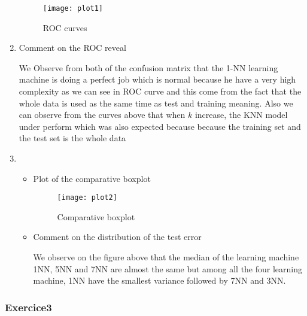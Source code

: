 \documentclass[12pt,a4paper]{article}
\begin{document}
\begin{enumerate}
\begin{figure}[H]
	\centering
	\texttt{[image: plot1]}
		\caption{ROC curves}
\end{figure}
	
\item Comment on the ROC reveal

We Observe from both of the confusion matrix that the 1-NN learning machine is doing a perfect job which is normal because he have a very high complexity as we can see in ROC curve and this come from the fact that the whole data is used as the same time as test and training meaning. Also we can observe from the curves above that when $k$ increase, the KNN model under perform which was also expected because because the training set and the test set is the whole data

\item \begin{itemize}
	\item Plot of the comparative boxplot
	
	\begin{figure}[H]
		\centering
		\texttt{[image: plot2]}
		\caption{Comparative boxplot}
	\end{figure}
	\item Comment on the distribution of the test error 
	
We observe on the figure above that the median of the learning machine 1NN, 5NN and 7NN are almost the same but among all the four learning machine, 1NN have the smallest variance followed by 7NN  and 3NN.

	
\end{itemize}	
\end{enumerate}	

\subsubsection*{Exercice3}
\end{document}
